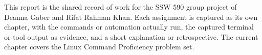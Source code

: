 This report is the shared record of work for the SSW 590 group project of
Deanna Gaber and Rifat Rahman Khan. Each assignment is captured as its own
chapter, with the commands or automation actually run, the captured terminal
or tool output as evidence, and a short explanation or retrospective. The
current chapter covers the Linux Command Proficiency problem set.
